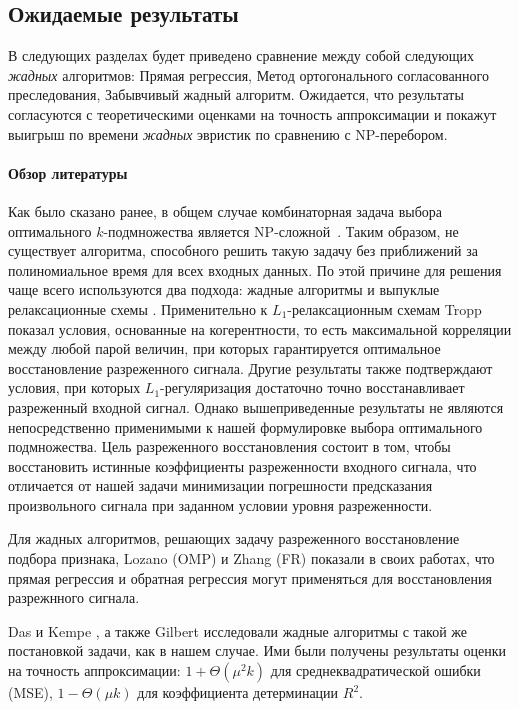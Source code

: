 \documentclass[preprint,12pt]{elsarticle}
\begin{document}
\subsection{Ожидаемые результаты}
В следующих разделах будет приведено сравнение между собой следующих \textit{жадных} алгоритмов: Прямая регрессия, Метод ортогонального согласованного преследования, Забывчивый жадный алгоритм. Ожидается, что результаты согласуются с теоретическими оценками на точность аппроксимации и покажут выигрыш по времени \textit{жадных} эвристик по сравнению с NP-перебором.

\paragraph{Обзор литературы}

Как было сказано ранее, в общем случае комбинаторная задача выбора оптимального $k$-подмножества является NP-сложной~\cite{das2011submodular}. Таким образом, не существует алгоритма, способного решить такую задачу без приближений за полиномиальное время для всех входных данных. По этой причине для решения чаще всего используются два подхода: жадные алгоритмы \cite{miller2002subset, tropp2004greed, gilbert2003approximation} и выпуклые релаксационные схемы \cite{obozinski2012convex, tibshirani1996regression, candes2006stable}. Применительно к $L_1$-релаксационным схемам Tropp \cite{tropp2006just} показал условия, основанные на когерентности, то есть максимальной корреляции между любой парой величин, при которых гарантируется оптимальное восстановление разреженного сигнала. Другие результаты \cite{zhou2009thresholding} также подтверждают условия, при которых $L_1$-регуляризация достаточно точно восстанавливает разреженный входной сигнал. Однако вышеприведенные результаты не являются непосредственно применимыми к
нашей формулировке выбора оптимального   подмножества. Цель разреженного восстановления состоит в том, чтобы восстановить истинные коэффициенты
разреженности входного сигнала, что отличается от нашей задачи минимизации погрешности предсказания произвольного сигнала при заданном условии
уровня разреженности.

Для жадных алгоритмов, решающих задачу разреженного восстановление подбора признака, Lozano \cite{swirszcz2009grouped} (OMP) и Zhang \cite{zhang2009consistency} (FR) показали в своих работах, что прямая регрессия и обратная регрессия могут применяться для восстановления разрежнного сигнала. 

Das и Kempe \cite{das2011submodular}, а также Gilbert \cite{gilbert2003approximation} исследовали жадные алгоритмы с такой же постановкой задачи, как в нашем случае. Ими были получены результаты оценки на точность аппроксимации: $1+\Theta\left(\mu^{2} k\right)$ для среднеквадратической ошибки (MSE), $1-\Theta(\mu k)$ для коэффициента детерминации $R^2$.
\end{document}

